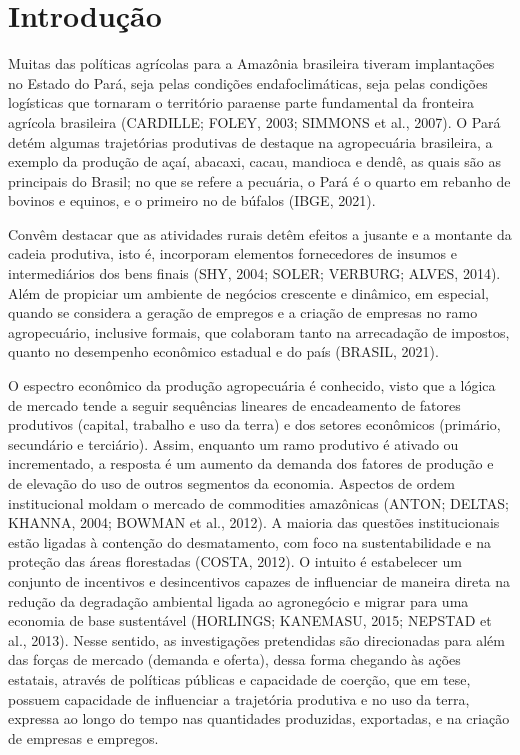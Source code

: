 

\section{Introdução}


Muitas das políticas agrícolas para a Amazônia brasileira tiveram implantações no Estado do Pará, seja pelas condições endafoclimáticas, seja pelas
condições logísticas que tornaram o território paraense parte fundamental da fronteira agrícola brasileira (CARDILLE; FOLEY, 2003; SIMMONS et al.,
2007). O Pará detém algumas trajetórias produtivas de destaque na agropecuária brasileira, a exemplo da produção de açaí, abacaxi, cacau, mandioca e
dendê, as quais são as principais do Brasil; no que se refere a pecuária, o Pará é o quarto em rebanho de bovinos e equinos, e o primeiro no de búfalos
(IBGE, 2021).

Convêm destacar que as atividades rurais detêm efeitos a jusante e a montante da cadeia produtiva, isto é, incorporam elementos fornecedores de
insumos e intermediários dos bens finais (SHY, 2004; SOLER; VERBURG; ALVES, 2014). Além de propiciar um ambiente de negócios crescente e
dinâmico, em especial, quando se considera a geração de empregos e a criação de empresas no ramo agropecuário, inclusive formais, que colaboram
tanto na arrecadação de impostos, quanto no desempenho econômico estadual e do país (BRASIL, 2021).

O espectro econômico da produção agropecuária é conhecido, visto que a lógica de mercado tende a seguir sequências lineares de encadeamento de
fatores produtivos (capital, trabalho e uso da terra) e dos setores econômicos (primário, secundário e terciário). Assim, enquanto um ramo produtivo é
ativado ou incrementado, a resposta é um aumento da demanda dos fatores de produção e de elevação do uso de outros segmentos da economia.
Aspectos de ordem institucional moldam o mercado de commodities amazônicas (ANTON; DELTAS; KHANNA, 2004; BOWMAN et al., 2012). A maioria
das questões institucionais estão ligadas à contenção do desmatamento, com foco na sustentabilidade e na proteção das áreas florestadas (COSTA,
2012). O intuito é estabelecer um conjunto de incentivos e desincentivos capazes de influenciar de maneira direta na redução da degradação ambiental
ligada ao agronegócio e migrar para uma economia de base sustentável (HORLINGS; KANEMASU, 2015; NEPSTAD et al., 2013). Nesse sentido, as
investigações pretendidas são direcionadas para além das forças de mercado (demanda e oferta), dessa forma chegando às ações estatais, através de
políticas públicas e capacidade de coerção, que em tese, possuem capacidade de influenciar a trajetória produtiva e no uso da terra, expressa ao longo do
tempo nas quantidades produzidas, exportadas, e na criação de empresas e empregos.

